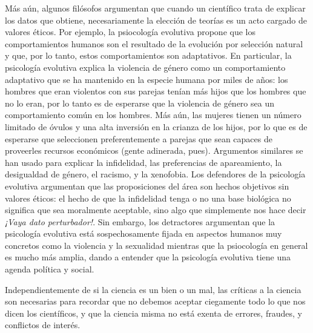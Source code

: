 Más aún, algunos filósofos argumentan que cuando un científico trata de
explicar los datos que obtiene, necesariamente la elección de teorías es un
acto cargado de valores éticos.
Por ejemplo, la psiocología evolutiva propone que los comportamientos humanos
son el resultado de la evolución por selección natural y que, por lo tanto,
estos comportamientos son adaptativos.
En particular, la psicología evolutiva explica la violencia de género como un
comportamiento adaptativo que se ha mantenido en la especie humana por miles de
años: los hombres que eran violentos con sus parejas tenían más hijos que los
hombres que no lo eran, por lo tanto es de esperarse que la violencia de género
sea un comportamiento común en los hombres.
Más aún, las mujeres tienen un número limitado de óvulos y una alta inversión
en la crianza de los hijos, por lo que es de esperarse que seleccionen
preferentemente a parejas que sean capaces de proveerles recursos económicos
(gente adinerada, pues).
Argumentos similares se han usado para explicar la infidelidad, las preferencias
de apareamiento, la desigualdad de género, el racismo, y la xenofobia.
Los defendores de la psicología evolutiva argumentan que las proposiciones del
área son hechos objetivos sin valores éticos: el hecho de que la infidelidad
tenga o no una base biológica no significa que sea moralmente aceptable,
sino algo que simplemente nos hace decir \emph{¡Vaya dato perturbador!}.
Sin embargo, los detractores argumentan que la psicología evolutiva está
sospechosamente fijada en aspectos humanos muy concretos como la violencia y la
sexualidad mientras que la psiocología en general es mucho más amplia, dando a
entender que la psicología evolutiva tiene una agenda política y social.

Independientemente de si la ciencia es un bien o un mal, las críticas a la
ciencia son necesarias para recordar que no debemos aceptar ciegamente todo lo
que nos dicen los científicos, y que la ciencia misma no está exenta de
errores, fraudes, y conflictos de interés.
